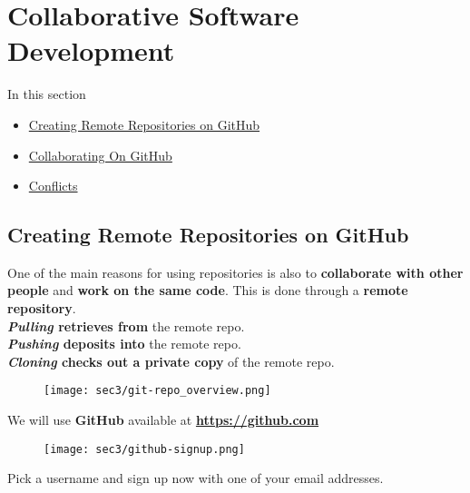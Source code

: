 \section{Collaborative Software Development}\hypertarget{sec3}{}

\begin{frame}[fragile]
\emptyframetitle
  In this section
  \begin{itemize}
    \item \hyperlink{sec3.1}{Creating Remote Repositories on GitHub}
    \item \hyperlink{sec3.2}{Collaborating On GitHub}
    \item \hyperlink{sec3.3}{Conflicts}
  \end{itemize}
\end{frame}

\subsection{Creating Remote Repositories on GitHub}\hypertarget{sec3.1}{}

\begin{frame}[fragile]
\emptyframetitle
  One of the main reasons for using repositories is also to \textbf{collaborate with other people} and \textbf{work on the same code}. This is done through a \textbf{remote repository}. \\[0.25cm]

  \textbf{\textit{Pulling} retrieves from} the remote repo.\\
  \textbf{\textit{Pushing} deposits into} the remote repo.\\
  \textbf{\textit{Cloning} checks out a private copy} of the remote repo.
  \begin{figure}[h]
    \texttt{[image: sec3/git-repo\_overview.png]}
  \end{figure}

\end{frame}

\begin{frame}[fragile]
\emptyframetitle
  We will use \textbf{GitHub} available at \textbf{\url{https://github.com}}

  \begin{figure}[h]
    \texttt{[image: sec3/github-signup.png]}
  \end{figure}

  Pick a username and sign up now with one of your email addresses.

\end{frame}


